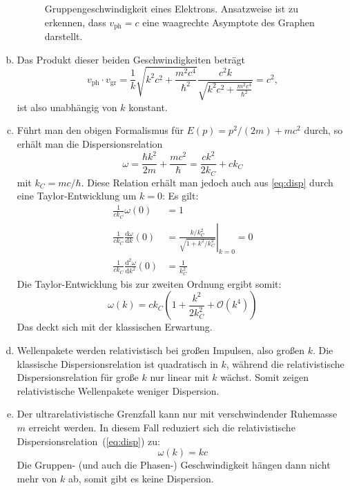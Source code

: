 \begin{enumerate}[(a)]
\begin{figure}[htbp]
\centering

\caption{Gruppengeschwindigkeit eines Elektrons. Ansatzweise ist zu erkennen, dass $v_\text{ph}=c$ eine waagrechte Asymptote des Graphen darstellt.}
\label{fig:vgruppe}
\end{figure}
\item Das Produkt dieser beiden Geschwindigkeiten beträgt
\begin{equation}
v_\text{ph}\cdot v_\text{gr} = \frac{1}{k}\sqrt{k^2c^2+\frac{m^2c^4}{\hbar^2}} \frac{c^2 k}{\sqrt{k^2c^2+\frac{m^2c^4}{\hbar^2}}} = c^2,
\end{equation}
ist also unabhängig von $k$ konstant.
\item  Führt man den obigen Formalismus für $E(p) = p^2/(2m) + mc^2$ durch, so erhält man die Dispersionsrelation
\begin{equation}
\omega = \frac{\hbar k^2}{2m} +\frac{mc^2}{\hbar} = \frac{c k^2}{2k_C} +ck_C
\end{equation}
mit $k_C = mc/\hbar$. Diese Relation erhält man jedoch auch aus \vref{eq:disp} durch eine Taylor-Entwicklung um $k=0$: Es gilt:
\begin{align}
\frac{1}{ck_C}\omega(0) &= 1 \\
\frac{1}{ck_C} \frac{\mathrm{d}\omega}{\mathrm{d}k}(0) &= \left. \frac{k/k_C^2}{\sqrt{1+k^2/k_C^2}}\right|_{k=0} = 0 \\
\frac{1}{ck_C} \frac{\mathrm{d}^2\omega}{\mathrm{d}k^2}(0) &= \frac{1}{k_C^2}
\end{align}
Die Taylor-Entwicklung bis zur zweiten Ordnung ergibt somit:
\begin{equation}
\omega(k) = ck_C \left( 1 + \frac{k^2}{2k_C^2} + \mathcal{O}(k^4) \right)
\end{equation}
Das deckt sich mit der klassischen Erwartung.
\item Wellenpakete werden relativistisch bei großen Impulsen, also großen $k$. Die klassische Dispersionsrelation ist quadratisch in $k$, während die relativistische Dispersionsrelation für große $k$ nur linear mit $k$ wächst. Somit zeigen relativistische Wellenpakete weniger Dispersion.
\item Der ultrarelativistische Grenzfall kann nur mit verschwindender Ruhemasse $m$ erreicht werden. In diesem Fall reduziert sich die relativistische Dispersionsrelation~(\ref{eq:disp}) zu:
\begin{equation}
\omega(k) = kc
\end{equation}
Die Gruppen- (und auch die Phasen-) Geschwindigkeit hängen dann nicht mehr von $k$ ab, somit gibt es keine Dispersion.
\end{enumerate}